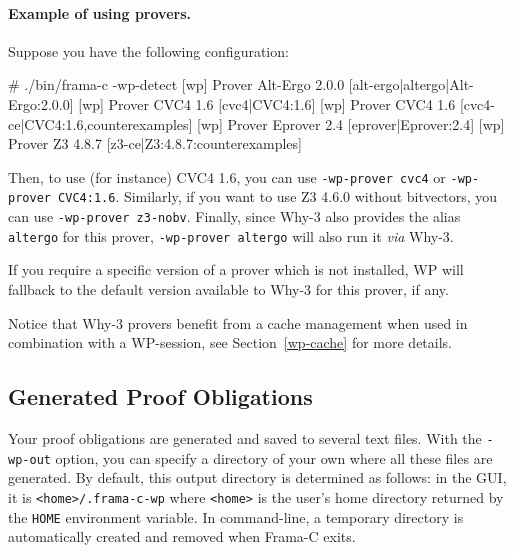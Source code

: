 \paragraph{Example of using provers.}
Suppose you have the following configuration:

\begin{logs}
# ./bin/frama-c -wp-detect
[wp] Prover   Alt-Ergo 2.0.0  [alt-ergo|altergo|Alt-Ergo:2.0.0]
[wp] Prover       CVC4 1.6    [cvc4|CVC4:1.6]
[wp] Prover       CVC4 1.6    [cvc4-ce|CVC4:1.6,counterexamples]
[wp] Prover    Eprover 2.4    [eprover|Eprover:2.4]
[wp] Prover         Z3 4.8.7  [z3-ce|Z3:4.8.7:counterexamples]
\end{logs}

Then, to use (for instance) \textsf{CVC4 1.6},
you can use \verb+-wp-prover cvc4+ or \verb+-wp-prover CVC4:1.6+.
Similarly, if you want to use \textsf{Z3 4.6.0} without bitvectors, you can use \verb+-wp-prover z3-nobv+.
Finally, since \textsf{Why-3} also provides the alias
\verb+altergo+ for this prover, \verb+-wp-prover altergo+ will also run it \emph{via} \textsf{Why-3}.

If you require a specific version of a prover which is not installed,
\textsf{WP} will fallback to the default version available to \textsf{Why-3} for this prover, if any.

Notice that \textsf{Why-3} provers benefit from a cache management when used in combination
with a \textsf{WP}-session, see Section~\ref{wp-cache} for more details.



\subsection{Generated Proof Obligations}
Your proof obligations are generated and saved to several text
files. With the \texttt{-wp-out} option, you can specify a directory
of your own where all these files are generated. By default, this
output directory is determined as follows: in the GUI, it is
\texttt{<home>/.frama-c-wp} where \texttt{<home>} is the user's home
directory returned by the \texttt{HOME} environment variable. In
command-line, a temporary directory is automatically created and
removed when \textsf{Frama-C} exits.


